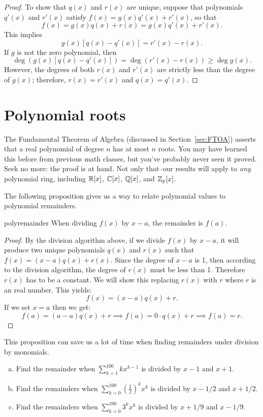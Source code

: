 \begin{proof}
To show that  $q(x)$ and $r(x)$ are unique, suppose that polynomials $q'(x)$ and $r'(x)$ satisfy $f(x) = g(x) q'(x)
+ r'(x)$, so that
\[
f(x) = g(x) q(x) + r(x) = g(x) q'(x) + r'(x).
\]
This implies
\[
g(x) [q(x) - q'(x) ] = r'(x) - r(x).
\]
If $g$ is not the zero polynomial, then 
\[
\deg( g(x) [q(x) - q'(x) ] )= \deg( r'(x) - r(x) ) \geq \deg g(x).
\]
However, the degrees of both $r(x)$ and $r'(x)$ are strictly less than
the degree of $g(x)$; therefore, $r(x) = r'(x)$ and $q(x) = q'(x)$.
\end{proof}

\section{Polynomial roots}
The Fundamental Theorem of Algebra (discussed in Section~\ref{sec:FTOA}) asserts that a real polynomial of degree $n$ has at most $n$ roots. You may have learned this before from previous math classes, but you've probably never seen it proved. Seek no more: the proof is at hand. Not only that--our results will apply to  \emph{any} polynomial ring, including $\mathbb{R}[x]$, $\mathbb{C}[x]$, $\mathbb{Q}[x]$, and $\mathbb{Z}_p[x]$.  

The following proposition gives us a way to relate polynomial values to polynomial remainders.

\begin {prop}{polyremainder}
When dividing $f(x)$ by $x-a$, the remainder is $f(a)$.
\end {prop}

\begin {proof}
By the division algorithm above, if we divide $f(x)$ by $x-a$, it will produce two unique polynomials $q(x)$ and $r(x)$ such that $f(x) = (x-a)q(x) + r(x)$.  Since the degree of $x-a$ is 1, then according to the division algorithm, the degree of $r(x)$ must be less than 1.  Therefore $r(x)$ has to be a constant.  We will show this replacing $r(x)$ with $r$ where $r$ is an real number.  This yields:
\[f(x) = (x-a)q(x) + r.\]
If we set $x=a$ then we get:
\[f(a) = (a-a)q(x) + r \implies f(a) = 0 \cdot q(x) + r \implies f(a) = r.\]
\end {proof}

This proposition can save us a lot of time when finding remainders under division by monomials.

\begin{exercise}{}
\begin{enumerate}[(a)]
\item
Find the remainder when $\sum_{k=1}^{100} k x^{k-1}$ is divided by $x-1$ and  $x+1$.
\item
Find the remainders when $\sum_{k=0}^{100} \left( \frac{1}{2} \right)^k x^k$ is divided by $x-1/2$ and $x+1/2$.
\item
Find the remainders when $\sum_{k=0}^{100} 3^k x^{k}$ is divided by $x+1/9$ and $x - 1/9$.
\end{enumerate}
\end{exercise}

